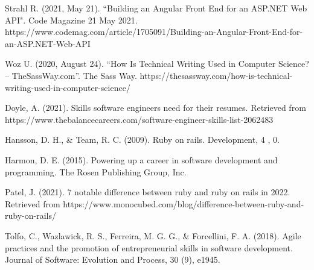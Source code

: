 \documentclass[a4paper, 11pt]{report}
\begin{document}
Strahl R. (2021, May 21). “Building an Angular Front End for an ASP.NET Web API". Code Magazine 21 May 2021.
    https://www.codemag.com/article/1705091/Building-an-Angular-Front-End-for-an-ASP.NET-Web-API
    
Woz U. (2020, August 24). “How Is Technical Writing Used in Computer Science? – TheSassWay.com”. The Sass Way. 
    https://thesassway.com/how-is-technical-writing-used-in-computer-science/

Doyle, A. (2021). Skills software engineers need for their resumes. Retrieved from https://www.thebalancecareers.com/software-engineer-skills-list-2062483 

Hansson, D. H., & Team, R. C. (2009). Ruby on rails. Development, 4 , 0. 

Harmon, D. E. (2015). Powering up a career in software development and programming. The Rosen Publishing Group, Inc. 

Patel, J. (2021). 7 notable difference between ruby and ruby on rails in 2022. Retrieved from https://www.monocubed.com/blog/difference-between-ruby-and-ruby-on-rails/ 

Tolfo, C., Wazlawick, R. S., Ferreira, M. G. G., & Forcellini, F. A. (2018). Agile practices and the promotion of entrepreneurial skills in software development. Journal of Software: Evolution and Process, 30 (9), e1945.

    
  
\end{document}
